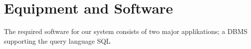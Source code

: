 \section{Equipment and Software}
\label{sec:equipmentsoftware}

The required software for our system consists of two major applikations; a DBMS supporting the query language SQL